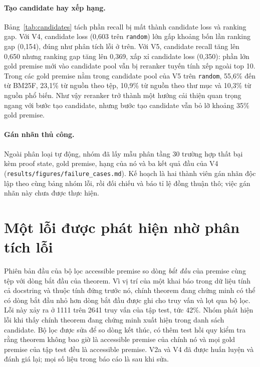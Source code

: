 \documentclass[11pt,a4paper,oneside]{report}
\newcommand{\code}[1]{\texttt{#1}}
\begin{document}


\paragraph{Tạo candidate hay xếp hạng.} Bảng~\ref{tab:candidates} tách phần recall bị mất thành candidate loss và
ranking gap. Với V4, candidate loss (0,603 trên \code{random}) lớn gấp khoảng bốn lần ranking gap (0,154), đúng như phân
tích lỗi ở trên. Với V5, candidate recall tăng lên 0,650 nhưng ranking gap tăng lên 0,369, xấp xỉ candidate loss (0,350):
phần lớn gold premise mới vào candidate pool vẫn bị reranker tuyến tính xếp ngoài top 10. Trong các gold premise nằm trong candidate pool
của V5 trên \code{random}, 55,6\% đến từ BM25F, 23,1\% từ nguồn theo tệp, 10,9\% từ nguồn theo thư mục và 10,3\% từ nguồn phổ
biến. Như vậy reranker trở thành một hướng cải thiện quan trọng ngang với bước tạo candidate, nhưng bước tạo candidate vẫn bỏ
lỡ khoảng 35\% gold premise.



\paragraph{Gán nhãn thủ công.} Ngoài phân loại tự động, nhóm đã lấy mẫu phân tầng 30 trường hợp thất bại kèm proof state,
gold premise, hạng của nó và ba kết quả đầu của V4 (\code{results/figures/failure\_cases.md}). Kế hoạch là hai thành viên
gán nhãn độc lập theo cùng bảng nhóm lỗi, rồi đối chiếu và báo tỉ lệ đồng thuận thô; việc gán nhãn này chưa được thực
hiện.

\section{Một lỗi được phát hiện nhờ phân tích lỗi}\label{sec:bug}

Phiên bản đầu của bộ lọc accessible premise so dòng \emph{bắt đầu} của premise cùng tệp với dòng bắt đầu của theorem. Vì
vị trí của một khai báo trong dữ liệu tính cả docstring và thuộc tính đứng trước nó, chính theorem đang chứng minh có thể
có dòng bắt đầu nhỏ hơn dòng bắt đầu được ghi cho truy vấn và lọt qua bộ lọc. Lỗi này xảy ra ở \num{1111} trên
\num{2641} truy vấn của tập test, tức 42\%. Nhóm phát hiện lỗi khi thấy chính theorem đang chứng minh xuất hiện trong
danh sách candidate. Bộ lọc được sửa để so dòng kết thúc, có thêm test hồi quy kiểm tra rằng theorem không bao giờ là
accessible premise của chính nó và mọi gold premise của tập test đều là accessible premise. V2a và V4 đã được huấn luyện và đánh giá lại;
mọi số liệu trong báo cáo là sau khi sửa.
\end{document}
